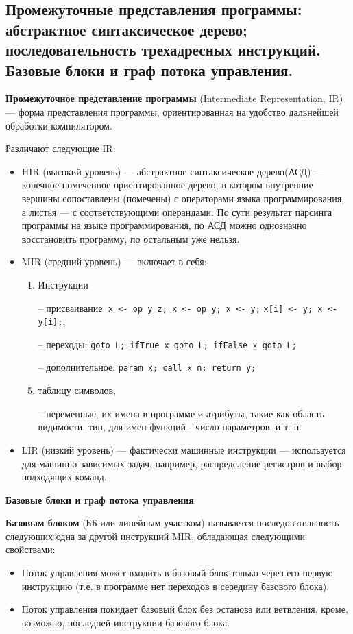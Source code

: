 \subsection{Промежуточные  представления  программы:  абстрактное  синтаксическое  дерево;  последовательность трехадресных инструкций. Базовые блоки и граф потока управления.}

\textbf{Промежуточное представление программы} (Intermediate Representation, IR) --- форма представления программы, ориентированная на удобство дальнейшей обработки компилятором.

Различают следующие IR:
\begin{itemize}
    \item HIR (высокий уровень) --- абстрактное синтаксическое дерево(АСД) --- конечное помеченное ориентированное дерево, в котором внутренние вершины сопоставлены (помечены) с операторами языка программирования, а листья --- с соответствующими операндами. По сути результат парсинга программы на языке программирования, по АСД можно однозначно восстановить программу, по остальным уже нельзя.
    \item MIR (средний уровень) --- включает в себя:
    \begin{enumerate}
        \item Инструкции
        \item[--] присваивание: \texttt{x <- op y z; x <- op y; x <- y;}
        \texttt{x[i] <- y; x <- y[i];},
        \item[--] переходы: \texttt{goto L; ifTrue x goto L; ifFalse x goto L;}
        \item[--] дополнительное: \texttt{param x; call x n; return y;}
        \item таблицу символов,
        \item[--] переменные, их имена в программе и атрибуты, такие как область видимости, тип, для имен функций - число параметров, и т. п.
    \end{enumerate}
    \item LIR (низкий уровень) --- фактически машинные инструкции --- используется для машинно-зависимых задач, например, распределение регистров и выбор подходящих команд.
\end{itemize}

\textbf{Базовые блоки и граф потока управления}

\textbf{Базовым блоком} (ББ или линейным участком) называется последовательность следующих одна за другой инструкций MIR, обладающая следующими свойствами:
\begin{itemize}
    \item Поток управления может входить в базовый блок только через его первую инструкцию (т.е. в программе нет переходов в середину базового блока),
    \item Поток управления покидает базовый блок без останова или ветвления, кроме, возможно, последней инструкции базового блока.
\end{itemize}

